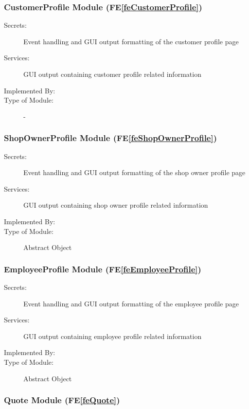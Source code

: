 \documentclass[12pt, titlepage]{article}
\newcommand{\feref}[1]{FE\ref{#1}}
\newcommand{\labelfedef}[1]{\label{fe#1def}}
\begin{document}
\subsubsection{CustomerProfile Module (\feref{feCustomerProfile}) \labelfedef{CustomerProfile}}
\begin{description}
    \item[Secrets:] Event handling and GUI output formatting of the customer profile page
    \item[Services:] GUI output containing customer profile related information
    \item[Implemented By:] \progname
    \item[Type of Module:] -
\end{description}

\subsubsection{ShopOwnerProfile Module (\feref{feShopOwnerProfile}) \labelfedef{ShopOwnerProfile}}
\begin{description}
    \item[Secrets:] Event handling and GUI output formatting of the shop owner profile page
    \item[Services:] GUI output containing shop owner profile related information
    \item[Implemented By:] \progname
    \item[Type of Module:] Abstract Object
\end{description}

\subsubsection{EmployeeProfile Module (\feref{feEmployeeProfile}) \labelfedef{EmployeeProfile}}
\begin{description}
    \item[Secrets:] Event handling and GUI output formatting of the employee profile page
    \item[Services:] GUI output containing employee profile related information
    \item[Implemented By:] \progname
    \item[Type of Module:] Abstract Object
\end{description}

\subsubsection{Quote Module (\feref{feQuote}) \labelfedef{Quote}}
\end{document}
